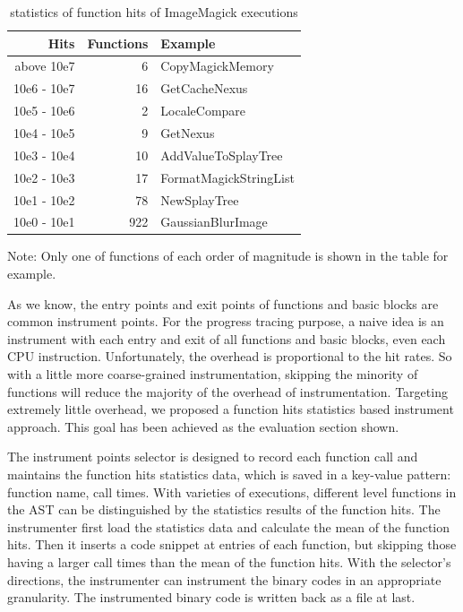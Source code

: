  \begin{table}[h]
\caption{statistics of function hits of ImageMagick executions}
\label{table:inst-stats}
\begin{center}
\begin{tabular}{r|r|l}
\hline
Hits & Functions & Example \\
\hline
above  10e7 & 6 & CopyMagickMemory \\
10e6 - 10e7 & 16 & GetCacheNexus \\
10e5 - 10e6 & 2 & LocaleCompare \\
10e4 - 10e5 & 9 & GetNexus \\
10e3 - 10e4 & 10 & AddValueToSplayTree \\
10e2 - 10e3 & 17 & FormatMagickStringList \\
10e1 - 10e2 & 78 & NewSplayTree \\
10e0 - 10e1 & 922 & GaussianBlurImage \\
\hline
\end{tabular}
\end{center}
Note: Only one of functions of each order of magnitude is shown in the table for example.
\end{table}

As we know, the entry points and exit points of functions and basic blocks are common instrument points. For the progress tracing purpose, a naive idea is an instrument with each entry and exit of all functions and basic blocks, even each CPU instruction. Unfortunately, the overhead is proportional to the hit rates. So with a little more coarse-grained instrumentation, skipping the minority of functions will reduce the majority of the overhead of instrumentation. Targeting extremely little overhead, we proposed a function hits statistics based instrument approach. This goal has been achieved as the evaluation section shown.

The instrument points selector is designed to record each function call and maintains the function hits statistics data, which is saved in a key-value pattern: function name, call times. With varieties of executions, different level functions in the AST can be distinguished by the statistics results of the function hits. The instrumenter first load the statistics data and calculate the mean of the function hits. Then it inserts a code snippet at entries of each function, but skipping those having a larger call times than the mean of the function hits. With the selector's directions, the instrumenter can instrument the binary codes in an appropriate granularity. The instrumented binary code is written back as a file at last.

